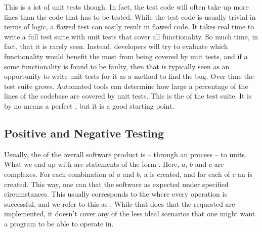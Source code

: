 This is a lot of unit tests though. In fact, the test code will often take up more lines than the code that has to be tested. While the test code is usually trivial in terms of logic, a flawed test can easily result in flawed code. It takes real time to write a full test suite with unit tests that cover all functionality. So much time, in fact, that it is rarely seen. Instead, developers will try to evaluate which functionality would benefit the most from being covered by unit tests, and if a some functionality is found to be faulty, then that is typically seen as an opportunity to write unit tests for it as a method to find the bug. Over time the test suite grows. Automated tools can determine how large a percentage of the lines of the codebase are covered by unit tests. This is the  of the test suite. It is by no means a perfect , but it is a good starting point.

\subsection{Positive and Negative Testing}

Usually, the  of the overall software product is -- through an  process --  to units. What we end up with are statements of the form . Here, $a$, $b$ and $c$ are complexes. For each combination of $a$ and $b$, a  is created, and for each of $c$ an  is created. This way, one can  that the software  as expected under specified circumstances. This usually corresponds to the  where every operation is successful, and we refer to this as . While that does  that the requested  are implemented, it doesn't cover any of the less ideal scenarios that one might want a program to be able to operate in.

